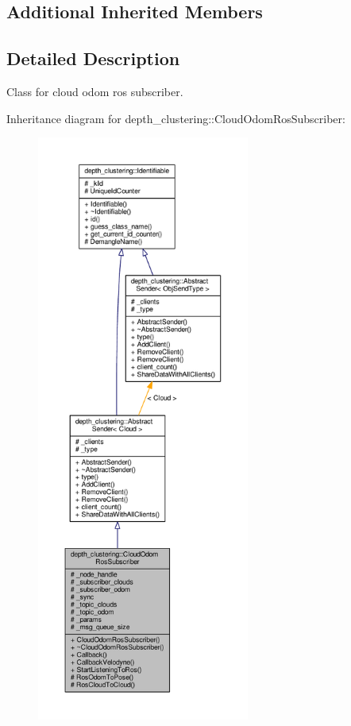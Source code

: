 \subsection*{Additional Inherited Members}


\subsection{Detailed Description}
Class for cloud odom ros subscriber. 

Inheritance diagram for depth\-\_\-clustering\-:\-:Cloud\-Odom\-Ros\-Subscriber\-:
\nopagebreak
\begin{figure}[H]
\begin{center}
\leavevmode
\includegraphics[height=550pt]{classdepth__clustering_1_1CloudOdomRosSubscriber__inherit__graph}
\end{center}
\end{figure}


